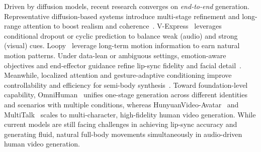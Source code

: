 Driven by diffusion models, recent research converges on \emph{end-to-end} generation. Representative diffusion-based systems introduce multi-stage refinement and long-range attention to boost realism and coherence~\cite{chen2025echomimic,meng2024echomimicv2,xu2024hallo,cui2024hallo2,cui2024hallo3}. V-Express~\cite{wang2024v} leverages conditional dropout or cyclic prediction to balance weak (audio) and strong (visual) cues. Loopy~\cite{jiang2024loopy} leverage long-term motion information to earn
natural motion patterns. Under data-lean or ambiguous settings, emotion-aware objectives and end-effector guidance refine lip-sync fidelity and facial detail~\cite{tian2024emo,tian2025emo2,wang2025fantasytalking,wei2025mocha,ji2024sonic}. Meanwhile, localized attention and gesture-adaptive conditioning improve controllability and efficiency for semi-body synthesis~\cite{lin2024cyberhost,liu2024tango,guo2024liveportrait}. Toward foundation-level capability, OmniHuman~\cite{lin2025omnihuman} unifies one-stage generation across different identities and scenarios with multiple conditions, whereas HunyuanVideo-Avatar~\cite{chen2025hunyuanvideoavatar} and MultiTalk~\cite{kong2025let} scales to multi-character, high-fidelity human video generation. While current models are still facing challenges in achieving lip-sync accuracy and generating fluid, natural full-body movements simultaneously in audio-driven human video generation.




